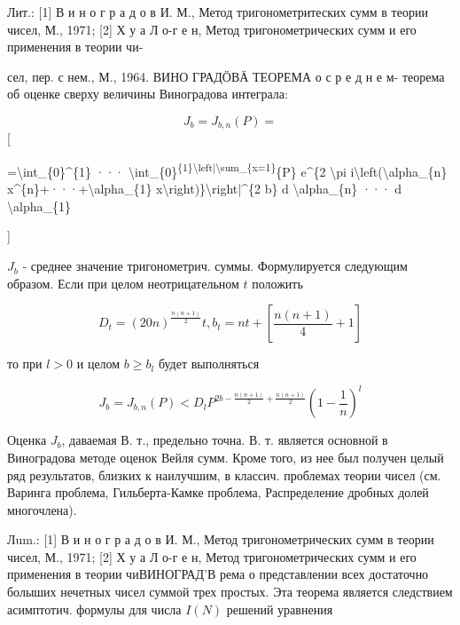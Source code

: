 \documentclass[10pt]{article}
\begin{document}
Лит.: [1] В и н о г р а д о в И. М., Метод тригонометритеских сумм в теории чисел, М., 1971; [2] Х у а Л о-г е н, Метод тригонометрических сумм и его применения в теории чи-

сел, пер. с нем., М., 1964. ВИНО ГРАДӦВӒ ТЕОРЕМА о с р е д н е м- теорема об оценке сверху величины Виноградова интеграла:



\[

J_{b}=J_{b, n}(P)=

\][



=\textbackslash int\_\{0\}\^{}\{1\} ··· \textbackslash int\_\{0\}\textsuperscript{\{1\}\textbackslash left|\textbackslash sum\_\{x=1\}}\{P\} e\^{}\{2 \textbackslash pi i\textbackslash left(\textbackslash alpha\_\{n\} x\^{}\{n\}+···+\textbackslash alpha\_\{1\} x\textbackslash right)\}\textbackslash right|\^{}\{2 b\} d \textbackslash alpha\_\{n\} ··· d \textbackslash alpha\_\{1\}

]



$J_{b}$ - среднее значение тригонометрич. суммы. Формулируется следующим образом. Если при целом неотрицательном $t$ положить



\[

D_{t}=(20 n)^{\frac{n(n+1)}{2}} t, b_{t}=n t+\left[\frac{n(n+1)}{4}+1\right]

\]



то при $l>0$ и целом $b \geqslant b_{l}$ будет выполняться



\[

J_{b}=J_{b, n}(P)<D_{l} P^{2 b-\frac{n(n+1)}{2}+\frac{n(n+1)}{2}}\left(1-\frac{1}{n}\right)^{l}

\]



Оценка $J_{b}$, даваемая В. т., предельно точна. В. т. является основной в Виноградова методе оценок Вейля сумм. Кроме того, из нее был получен целый ряд результатов, близких к наилучшим, в классич. проблемах теории чисел (см. Варинга проблема, Гильберта-Камке проблема, Распределение дробных долей многочлена).



Лum.: [1] В и н о г р а д о в И. М., Метод тригонометрических сумм в теории чисел, М., 1971; [2] Х у а Л о-г е н, Метод тригонометрических сумм и его применения в теории чиВИНОГРАД'В рема о представлении всех достаточно болыших нечетных чисел суммой трех простых. Эта теорема является следствием асимптотич. формулы для числа $I(N)$ решений уравнения
\end{document}
